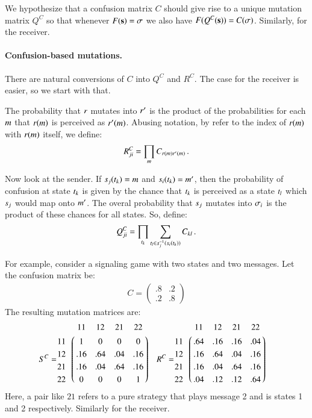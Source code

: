 \documentclass[fleqn,reqno,10pt]{article}
\renewcommand{\Smixed}{\ensuremath{\mathrm{\mathbf{s}}}}
\begin{document}
We hypothesize that a confusion matrix $C$ should give rise to a
unique mutation matrix $Q^C$ so that whenever $F(\Smixed) = \Sstrat$
we also have $F(Q^C(\Smixed)) = C(\Sstrat)$. Similarly, for the
receiver.

\paragraph{Confusion-based mutations.} There are natural conversions
of $C$ into $Q^C$ and $R^C$. The case for the receiver is easier, so
we start with that.

The probability that $r$ mutates into $r'$ is the product
of the probabilities for each $m$ that $r(m)$ is
perceived as $r'(m)$. Abusing notation, by refer to the
index of $r(m)$ with $r(m)$ itself, we define:
\begin{align*}
  R^C_{ji} = \prod_{m} C_{r(m)r'(m)}\,.
\end{align*}

Now look at the sender. If $s_j(t_k)=m$ and
$s_i(t_k)=m'$, then the probability of confusion at
state $t_k$ is given by the chance that $t_k$ is perceived
as a state $t_l$ which $s_j$ would map onto $m'$. The
overal probability that $s_j$ mutates into $\sigma_i$ is the
product of these chances for all states. So, define:
\begin{align*}
  Q^C_{ji} = \prod_{t_k} \sum_{t_l \in
    s_j^{-1}(s_i(t_k))} C_{kl}\,.
\end{align*}

For example, consider a signaling game with two states and two
messages. Let the confusion matrix be:
\begin{align*}
  C=
  \begin{pmatrix}
    .8 & .2 \\
    .2 & .8 
  \end{pmatrix}
\end{align*}
The resulting mutation matrices are:
\begin{align*}
S^C & = \bordermatrix{ ~ & 11 & 12 & 21 & 22 \cr
                      11 & 1 & 0 & 0 & 0 \cr
                      12 & .16 & .64 & .04 & .16 \cr
                      21 & .16 & .04 & .64 & .16 \cr
                      22 & 0 & 0 & 0 & 1 \cr}
&                    
  R^C & = \bordermatrix{ ~ & 11 & 12 & 21 & 22 \cr
                      11 & .64 & .16 & .16 & .04 \cr
                      12 & .16 & .64 & .04 & .16 \cr
                      21 & .16 & .04 & .64 & .16 \cr
                      22 & .04 & .12 & .12 & .64 \cr}
\end{align*}
Here, a pair like $21$ refers to a pure strategy that plays message 2
and is states 1 and 2 respectively. Similarly for the receiver.
\end{document}
